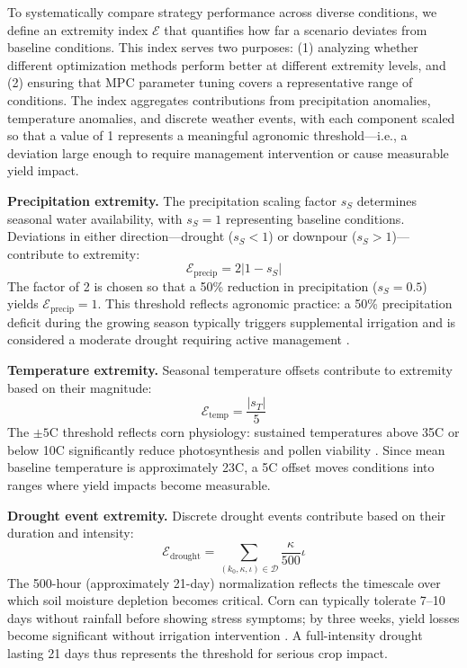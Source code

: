 \documentclass[pdflatex,sn-mathphys-num]{sn-jnl}
\newcommand{\df}[2]{\displaystyle\frac{#1}{#2}}
\begin{document}
To systematically compare strategy performance across diverse conditions, we define an extremity index $\mathcal{E}$ that quantifies how far a scenario deviates from baseline conditions. This index serves two purposes: (1) analyzing whether different optimization methods perform better at different extremity levels, and (2) ensuring that MPC parameter tuning covers a representative range of conditions. The index aggregates contributions from precipitation anomalies, temperature anomalies, and discrete weather events, with each component scaled so that a value of 1 represents a meaningful agronomic threshold---i.e., a deviation large enough to require management intervention or cause measurable yield impact.

\textbf{Precipitation extremity.} The precipitation scaling factor $s_S$ determines seasonal water availability, with $s_S = 1$ representing baseline conditions. Deviations in either direction---drought ($s_S < 1$) or downpour ($s_S > 1$)---contribute to extremity:
\begin{equation}
\mathcal{E}_{\text{precip}} = 2|1 - s_{S}|
\label{eqn:extreme-precip}
\end{equation}
The factor of 2 is chosen so that a 50\% reduction in precipitation ($s_S = 0.5$) yields $\mathcal{E}_{\text{precip}} = 1$. This threshold reflects agronomic practice: a 50\% precipitation deficit during the growing season typically triggers supplemental irrigation and is considered a moderate drought requiring active management \cite{kranz2008irrigation}.

\textbf{Temperature extremity.} Seasonal temperature offsets contribute to extremity based on their magnitude:
\begin{equation}
\mathcal{E}_{\text{temp}} = \df{|s_{T}|}{5}
\label{eqn:extreme-temp}
\end{equation}
The $\pm 5$\textdegree C threshold reflects corn physiology: sustained temperatures above 35\textdegree C or below 10\textdegree C significantly reduce photosynthesis and pollen viability \cite{hatfield2015temperature}. Since mean baseline temperature is approximately 23\textdegree C, a 5\textdegree C offset moves conditions into ranges where yield impacts become measurable.

\textbf{Drought event extremity.} Discrete drought events contribute based on their duration and intensity:
\begin{equation}
\mathcal{E}_{\text{drought}} = \sum_{(k_{0}, \kappa, \iota)\in \mathcal{D}} \df{\kappa}{500}\iota
\label{eqn:extreme-drought}
\end{equation}
The 500-hour (approximately 21-day) normalization reflects the timescale over which soil moisture depletion becomes critical. Corn can typically tolerate 7--10 days without rainfall before showing stress symptoms; by three weeks, yield losses become significant without irrigation intervention \cite{kranz2008irrigation}. A full-intensity drought lasting 21 days thus represents the threshold for serious crop impact.
\end{document}
